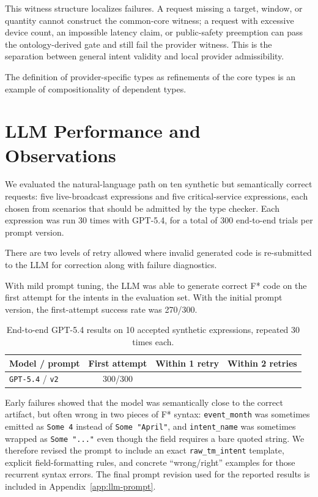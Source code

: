 \documentclass[conference]{IEEEtran}
\begin{document}
This witness structure localizes failures. A request missing a target, window, or quantity cannot construct the common-core witness; a request with excessive device count, an impossible latency claim, or public-safety preemption can pass the ontology-derived gate and still fail the provider witness. This is the separation between general intent validity and local provider admissibility. 

The definition of provider-specific types as refinements of the core types is an example of compositionality of dependent types. 

\section{LLM Performance and Observations}

We evaluated the natural-language path on ten synthetic but semantically correct requests: five live-broadcast expressions and five critical-service expressions, each chosen from scenarios that should be admitted by the type checker. Each expression was run 30 times with GPT-5.4, for a total of 300 end-to-end trials per prompt version. 

There are two levels of retry allowed where invalid generated code is re-submitted to the LLM for correction along with failure diagnostics.

With mild prompt tuning, the LLM was able to generate correct F* code on the first attempt for the intents in the evaluation set. With the initial prompt version, the first-attempt success rate was 270/300.

\begin{table}[t]
\centering
\caption{End-to-end GPT-5.4 results on 10 accepted synthetic expressions, repeated 30 times each.}
\label{tab:llm-performance}
\begin{tabular}{lccc}
\hline
Model / prompt & First attempt & Within 1 retry & Within 2 retries \\
\hline
\texttt{GPT-5.4} / \texttt{v2} & 300/300 & \- & \- \\
\hline
\end{tabular}
\end{table}

Early failures showed that the model was semantically close to the correct artifact, but often wrong in two pieces of F* syntax: \texttt{event\_month} was sometimes emitted as \texttt{Some 4} instead of \texttt{Some "April"}, and \texttt{intent\_name} was sometimes wrapped as \texttt{Some "..."} even though the field requires a bare quoted string. We therefore revised the prompt to include an exact \texttt{raw\_tm\_intent} template, explicit field-formatting rules, and concrete ``wrong/right'' examples for those recurrent syntax errors. The final prompt revision used for the reported results is included in Appendix~\ref{app:llm-prompt}.
\end{document}
